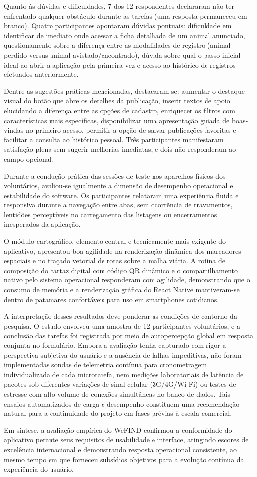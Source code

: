 Quanto às dúvidas e dificuldades, 7 dos 12 respondentes declararam não ter enfrentado qualquer obstáculo durante as tarefas (uma resposta permaneceu em branco). Quatro participantes apontaram dúvidas pontuais: dificuldade em identificar de imediato onde acessar a ficha detalhada de um animal anunciado, questionamento sobre a diferença entre as modalidades de registro (animal perdido versus animal avistado/encontrado), dúvida sobre qual o passo inicial ideal ao abrir a aplicação pela primeira vez e acesso ao histórico de registros efetuados anteriormente.

Dentre as sugestões práticas mencionadas, destacaram-se: aumentar o destaque visual do botão que abre os detalhes da publicação, inserir textos de apoio elucidando a diferença entre as opções de cadastro, enriquecer os filtros com características mais específicas, disponibilizar uma apresentação guiada de boas-vindas no primeiro acesso, permitir a opção de salvar publicações favoritas e facilitar a consulta ao histórico pessoal. Três participantes manifestaram satisfação plena sem sugerir melhorias imediatas, e dois não responderam ao campo opcional.

Durante a condução prática das sessões de teste nos aparelhos físicos dos voluntários, avaliou-se igualmente a dimensão de desempenho operacional e estabilidade do software. Os participantes relataram uma experiência fluida e responsiva durante a navegação entre abas, sem ocorrência de travamentos, lentidões perceptíveis no carregamento das listagens ou encerramentos inesperados da aplicação.

O módulo cartográfico, elemento central e tecnicamente mais exigente do aplicativo, apresentou boa agilidade na renderização dinâmica dos marcadores espaciais e no traçado vetorial de rotas sobre a malha viária. A rotina de composição do cartaz digital com código QR dinâmico e o compartilhamento nativo pelo sistema operacional responderam com agilidade, demonstrando que o consumo de memória e a renderização gráfica do React Native mantiveram-se dentro de patamares confortáveis para uso em smartphones cotidianos.

A interpretação desses resultados deve ponderar as condições de contorno da pesquisa. O estudo envolveu uma amostra de 12 participantes voluntários, e a conclusão das tarefas foi registrada por meio de autopercepção global em resposta conjunta no formulário. Embora a avaliação tenha capturado com rigor a perspectiva subjetiva do usuário e a ausência de falhas impeditivas, não foram implementadas sondas de telemetria contínua para cronometragem individualizada de cada microtarefa, nem medições laboratoriais de latência de pacotes sob diferentes variações de sinal celular (3G/4G/Wi-Fi) ou testes de estresse com alto volume de conexões simultâneas no banco de dados. Tais ensaios automatizados de carga e desempenho constituem uma recomendação natural para a continuidade do projeto em fases prévias à escala comercial.

Em síntese, a avaliação empírica do WeFIND confirmou a conformidade do aplicativo perante seus requisitos de usabilidade e interface, atingindo escores de excelência internacional e demonstrando resposta operacional consistente, ao mesmo tempo em que forneceu subsídios objetivos para a evolução contínua da experiência do usuário.
